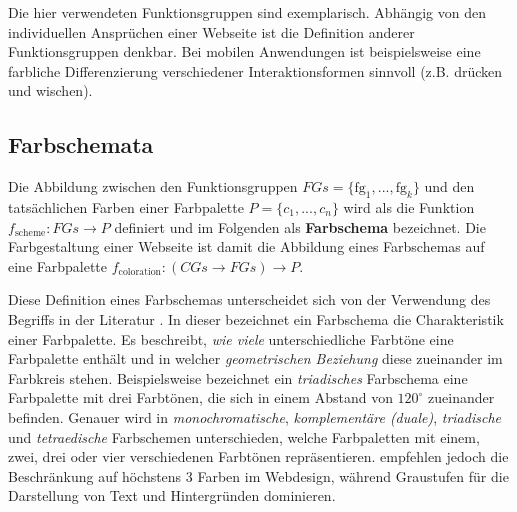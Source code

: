 Die hier verwendeten Funktionsgruppen sind exemplarisch. Abhängig von den individuellen Ansprüchen einer Webseite ist die Definition anderer Funktionsgruppen denkbar. Bei mobilen Anwendungen ist beispielsweise eine farbliche Differenzierung verschiedener Interaktionsformen sinnvoll (z.B. drücken und wischen).

\subsection{Farbschemata}
\label{sec:farbschemata}

Die Abbildung zwischen den Funktionsgruppen $FGs = \{\text{fg}_1, ... , \text{fg}_k\}$ und den tatsächlichen Farben einer Farbpalette $P = \{c_1, ... , c_n\}$ wird als die Funktion $f_\text{scheme}: FGs \to P$ definiert und im Folgenden als \textbf{Farbschema} bezeichnet. Die Farbgestaltung einer Webseite ist damit die Abbildung eines Farbschemas auf eine Farbpalette $f_\text{coloration}: (CGs \to FGs) \to P$.

Diese Definition eines Farbschemas unterscheidet sich von der Verwendung des Begriffs in der Literatur \citep{webdesign}. In dieser bezeichnet ein Farbschema die Charakteristik einer Farbpalette. Es beschreibt, \emph{wie viele} unterschiedliche Farbtöne eine Farbpalette enthält und in welcher \emph{geometrischen Beziehung} diese zueinander im Farbkreis stehen. Beispielsweise bezeichnet ein \emph{triadisches} Farbschema eine Farbpalette mit drei Farbtönen, die sich in einem Abstand von $120^{\circ}$ zueinander befinden. Genauer wird in  \emph{monochromatische}, \emph{komplementäre (duale)}, \emph{triadische} und \emph{tetraedische} Farbschemen unterschieden, welche Farbpaletten mit einem, zwei, drei oder vier verschiedenen Farbtönen repräsentieren. \citep{underestimated, smashing, google} empfehlen jedoch die Beschränkung auf höchstens 3 Farben im Webdesign, während Graustufen für die Darstellung von Text und Hintergründen dominieren.
    

